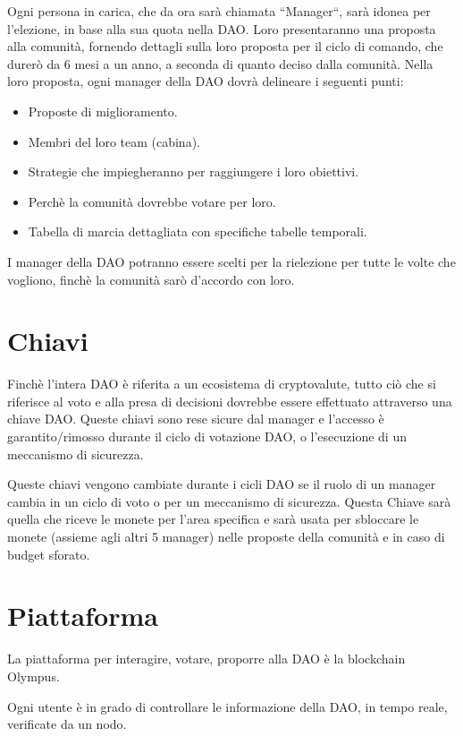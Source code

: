 \documentclass{article}
\begin{document}
Ogni persona in carica, che da ora sarà chiamata ``Manager``, sarà idonea per l'elezione, in base alla sua quota nella DAO. Loro presentaranno una proposta alla comunità, fornendo dettagli sulla loro proposta per il ciclo di comando, che durerò da 6 mesi a un anno, a seconda di quanto deciso dalla comunità. Nella loro proposta, ogni manager della DAO dovrà delineare i seguenti punti:

\begin{itemize}
  \item Proposte di miglioramento.
  \item Membri del loro team (cabina).
  \item Strategie che impiegheranno per raggiungere i loro obiettivi.
  \item Perchè la comunità dovrebbe votare per loro.
  \item Tabella di marcia dettagliata con specifiche tabelle temporali.
\end{itemize}

I manager della DAO potranno essere scelti per la rielezione per tutte le volte che vogliono, finchè la comunità sarò d'accordo con loro.

\section{Chiavi}

Finchè l'intera DAO è riferita a un ecosistema di cryptovalute, tutto ciò che si riferisce al voto e alla presa di decisioni dovrebbe essere effettuato attraverso una chiave DAO. Queste chiavi sono rese sicure dal manager e l'accesso è garantito/rimosso durante il ciclo di votazione DAO, o l'esecuzione di un meccanismo di sicurezza.

Queste chiavi vengono cambiate durante i cicli DAO se il ruolo di un manager cambia in un ciclo di voto o per un meccanismo di sicurezza. Questa Chiave sarà quella che riceve le monete per l'area specifica e sarà usata per sbloccare le monete (assieme agli altri 5 manager) nelle proposte della comunità e in caso di budget sforato.

\section{Piattaforma}

La piattaforma per interagire, votare, proporre alla DAO è la blockchain Olympus.

Ogni utente è in grado di controllare le informazione della DAO, in tempo reale, verificate da un nodo.
\end{document}
